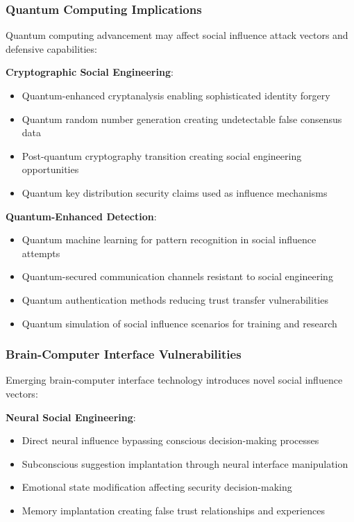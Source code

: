 \documentclass[11pt,a4paper]{article}
\begin{document}
\subsubsection{Quantum Computing Implications}

Quantum computing advancement may affect social influence attack vectors and defensive capabilities:

\textbf{Cryptographic Social Engineering}:
\begin{itemize}
\item Quantum-enhanced cryptanalysis enabling sophisticated identity forgery
\item Quantum random number generation creating undetectable false consensus data
\item Post-quantum cryptography transition creating social engineering opportunities
\item Quantum key distribution security claims used as influence mechanisms
\end{itemize}

\textbf{Quantum-Enhanced Detection}:
\begin{itemize}
\item Quantum machine learning for pattern recognition in social influence attempts
\item Quantum-secured communication channels resistant to social engineering
\item Quantum authentication methods reducing trust transfer vulnerabilities
\item Quantum simulation of social influence scenarios for training and research
\end{itemize}

\subsubsection{Brain-Computer Interface Vulnerabilities}

Emerging brain-computer interface technology introduces novel social influence vectors:

\textbf{Neural Social Engineering}:
\begin{itemize}
\item Direct neural influence bypassing conscious decision-making processes
\item Subconscious suggestion implantation through neural interface manipulation
\item Emotional state modification affecting security decision-making
\item Memory implantation creating false trust relationships and experiences
\end{itemize}
\end{document}
